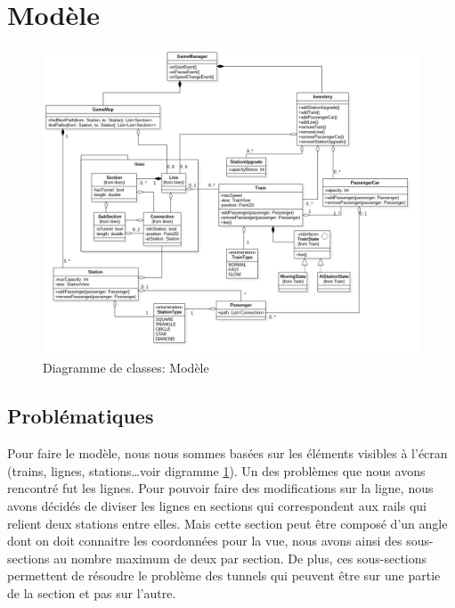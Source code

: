 \documentclass[report, backcover, french, nodocumentinfo]{upmethodology-document}
\begin{document}
		\section{Modèle}
			\begin{figure}[h!]
				\centering
				\includegraphics[width=1\textwidth]{figures/ModelClassDiagram}
				\caption{Diagramme de classes: Modèle}
				\label{fig:ModelClassDiagram}
			\end{figure}
			\subsection{Problématiques}
				\p{}
					Pour faire le modèle, nous nous sommes basées sur les éléments visibles à l'écran (trains, lignes, stations\ldots voir digramme \ref{fig:ModelClassDiagram}). Un des problèmes que nous avons rencontré fut les lignes. Pour pouvoir faire des modifications sur la ligne, nous avons décidés de diviser les lignes en sections qui correspondent aux rails qui relient deux stations entre elles. Mais cette section peut être composé d'un angle dont on doit connaitre les coordonnées pour la vue, nous avons ainsi des sous-sections au nombre maximum de deux par section. De plus, ces sous-sections permettent de résoudre le problème des tunnels qui peuvent être sur une partie de la section et pas sur l'autre.
\end{document}
